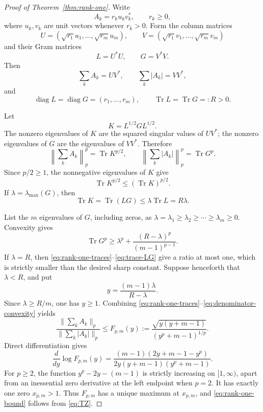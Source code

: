 \documentclass[11pt,reqno]{amsart}
\theoremstyle{remark}
\newcommand{\Tr}{\operatorname{Tr}}
\begin{document}
\begin{proof}[Proof of Theorem~\ref{thm:rank-one}]
Write
\[
 A_k=r_k u_kv_k^*,\qquad r_k\ge0,
\]
where \(u_k,v_k\) are unit vectors whenever \(r_k>0\).  Form the column
matrices
\[
 U=(\sqrt{r_1}u_1,\ldots,\sqrt{r_m}u_m),\qquad
 V=(\sqrt{r_1}v_1,\ldots,\sqrt{r_m}v_m)
\]
and their Gram matrices
\[
 L=U^*U,\qquad G=V^*V.
\]
Then
\begin{equation}\label{eq:rank-one-factorization}
 \sum_k A_k=UV^*,\qquad
 \sum_k|A_k|=VV^*,
\end{equation}
and
\begin{equation}\label{eq:common-diagonal}
 \operatorname{diag}L=\operatorname{diag}G=(r_1,\ldots,r_m),\qquad
 \Tr L=\Tr G=:R>0.
\end{equation}

Let
\[
 K=L^{1/2}GL^{1/2}.
\]
The nonzero eigenvalues of \(K\) are the squared singular values of \(UV^*\);
the nonzero eigenvalues of \(G\) are the eigenvalues of \(VV^*\).
Therefore
\begin{equation}\label{eq:rank-one-traces}
 \left\|\sum_k A_k\right\|_p^p=\Tr K^{p/2},\qquad
 \left\|\sum_k|A_k|\right\|_p^p=\Tr G^p.
\end{equation}
Since \(p/2\ge1\), the nonnegative eigenvalues of \(K\) give
\begin{equation}\label{eq:trace-power}
 \Tr K^{p/2}\le(\Tr K)^{p/2}.
\end{equation}
If \(\lambda=\lambda_{\max}(G)\), then
\begin{equation}\label{eq:trace-LG}
 \Tr K=\Tr(LG)\le \lambda\Tr L=R\lambda.
\end{equation}

List the \(m\) eigenvalues of \(G\), including zeros, as
\(\lambda=\lambda_1\ge\lambda_2\ge\cdots\ge\lambda_m\ge0\).
Convexity gives
\begin{equation}\label{eq:denominator-convexity}
 \Tr G^p
 \ge
 \lambda^p+\frac{(R-\lambda)^p}{(m-1)^{p-1}}.
\end{equation}
If \(\lambda=R\), then \eqref{eq:rank-one-traces}--\eqref{eq:trace-LG}
give a ratio at most one, which is strictly smaller than the desired sharp
constant.  Suppose henceforth that \(\lambda<R\), and put
\[
 y=\frac{(m-1)\lambda}{R-\lambda}.
\]
Since \(\lambda\ge R/m\), one has \(y\ge1\).  Combining
\eqref{eq:rank-one-traces}--\eqref{eq:denominator-convexity} yields
\begin{equation}\label{eq:scalar-reduction}
 \frac{\|\sum_kA_k\|_p}{\|\sum_k|A_k|\|_p}
 \le
 F_{p,m}(y)
 :=
 \frac{\sqrt{y(y+m-1)}}{(y^p+m-1)^{1/p}}.
\end{equation}
Direct differentiation gives
\[
 \frac{d}{dy}\log F_{p,m}(y)
 =
 \frac{(m-1)(2y+m-1-y^p)}
 {2y(y+m-1)(y^p+m-1)}.
\]
For \(p\ge2\), the function \(y^p-2y-(m-1)\) is strictly increasing on
\([1,\infty)\), apart from an inessential zero derivative at the left
endpoint when \(p=2\).  It has exactly one zero \(x_{p,m}>1\).
Thus \(F_{p,m}\) has a unique maximum at \(x_{p,m}\), and
\eqref{eq:rank-one-bound} follows from \eqref{eq:TZ}.


\end{proof}
\end{document}
